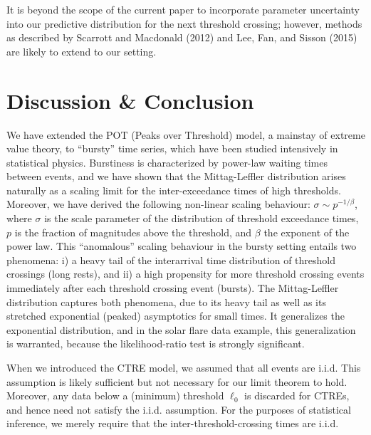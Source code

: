\documentclass[smallextended]{svjour3}       %
\begin{document}
It is beyond the scope of the current paper to incorporate parameter
uncertainty into our predictive distribution for the next threshold
crossing; however, methods as described by Scarrott and Macdonald (2012)
and Lee, Fan, and Sisson (2015) are likely to extend to our setting.

\section{Discussion \& Conclusion}\label{discussion-conclusion}

We have extended the POT (Peaks over Threshold) model, a mainstay of
extreme value theory, to ``bursty'' time series, which have been studied
intensively in statistical physics. Burstiness is characterized by
power-law waiting times between events, and we have shown that the
Mittag-Leffler distribution arises naturally as a scaling limit for the
inter-exceedance times of high thresholds. Moreover, we have derived the
following non-linear scaling behaviour: \(\sigma \sim p^{-1/\beta}\),
where \(\sigma\) is the scale parameter of the distribution of threshold
exceedance times, \(p\) is the fraction of magnitudes above the
threshold, and \(\beta\) the exponent of the power law. This
``anomalous'' scaling behaviour in the bursty setting entails two
phenomena: i) a heavy tail of the interarrival time distribution of
threshold crossings (long rests), and ii) a high propensity for more
threshold crossing events immediately after each threshold crossing
event (bursts). The Mittag-Leffler distribution captures both phenomena,
due to its heavy tail as well as its stretched exponential (peaked)
asymptotics for small times. It generalizes the exponential
distribution, and in the solar flare data example, this generalization
is warranted, because the likelihood-ratio test is strongly significant.

When we introduced the CTRE model, we assumed that all events are i.i.d.
This assumption is likely sufficient but not necessary for our limit
theorem to hold. Moreover, any data below a (minimum) threshold
\(\ell_0\) is discarded for CTREs, and hence need not satisfy the i.i.d.
assumption. For the purposes of statistical inference, we merely require
that the inter-threshold-crossing times are i.i.d.
\end{document}
